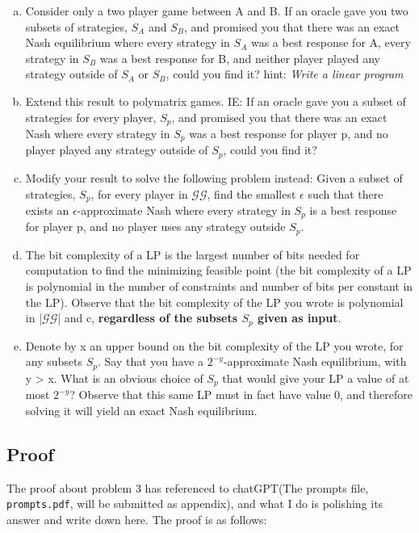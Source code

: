 \documentclass{article}
\begin{document}
\begin{enumerate}[(a)]
    \item Consider only a two player game between A and B. If an oracle gave you two subsets of strategies, $S_A$ and $S_B$, and promised you that there was an exact Nash equilibrium where every strategy in $S_A$ was a best response for A, every strategy in $S_B$ was a best response for B, and neither player played any strategy outside of $S_A$ or $S_B$, could you find it? hint: \textit{Write a linear program}
    \item Extend this result to polymatrix games. IE: If an oracle gave you a subset of strategies for every player, $S_p$, and promised you that there was an exact Nash where every strategy in $S_p$ was a best response for player p, and no player played any strategy outside of $S_p$, could you find it?
    \item Modify your result to solve the following problem instead: Given a subset of strategies, $S_p$, for every player in $\mathcal{GG}$, find the smallest $\epsilon$ such that there exists an $\epsilon$-approximate Nash where every strategy in $S_p$ is a best response for player p, and no player uses any strategy outside $S_p$.
    \item The bit complexity of a LP is the largest number of bits needed for computation to find the minimizing feasible point (the bit complexity of a LP is polynomial in the number of constraints and number of bits per constant in the LP). Observe that the bit complexity of the LP you wrote is polynomial in |$\mathcal{GG}$| and c, \textbf{regardless of the subsets $S_p$ given as input}.
    \item  Denote by x an upper bound on the bit complexity of the LP you wrote, for any subsets $S_p$. Say that you have a $2^{-y}$-approximate Nash equilibrium, with y > x. What is an obvious choice of $S_p$ that would give your LP a value of at most $2^{-y}$? Observe that this same LP must in fact have value 0, and therefore solving it will yield an exact Nash equilibrium.
    
\end{enumerate}

\subsection{Proof}

The proof about problem 3 has referenced to chatGPT(The prompts file, \texttt{prompts.pdf}, will be submitted as appendix), and what I do is polishing its answer and write down here. The proof is as follows:
\end{document}
